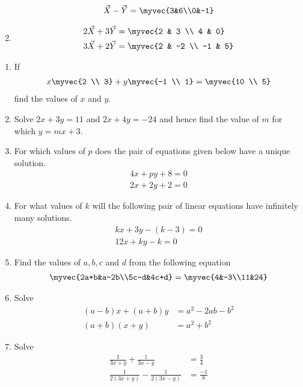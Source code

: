 \begin{multicols}{2}
\begin{enumerate}[label=\thesubsection.\arabic*,ref=\thesubsection.\theenumi]
\begin{align*}
	\\
\vec{X}-\vec{Y}=\myvec{3&6\\0&-1}
\end{align*}
\item 
\begin{align*}
	2\vec{X}+3\vec{Y}&=\myvec
{2 & 3 \\ 4 & 0}  
	\\
	3\vec{X}+2\vec{Y}&=\myvec
{2 & -2 \\ -1 & 5}
\end{align*}
\end{enumerate}
\end{multicols}
\begin{enumerate}[label=\thesubsection.\arabic*,ref=\thesubsection.\theenumi,resume*]
\item If 
\begin{align}
	x \myvec
{2 \\ 3} + y \myvec
{-1 \\ 1}= \myvec
{10 \\ 5}
\end{align}
find the values of $x$ and $y$.
\item Solve $2x+3y=11$ and $2x+4y=-24$ and hence find the value of $m$ for which $y=mx+3$.
\item For which values of $p$ does the pair of equations given below have a unique solution.
\begin{align}
4x+py+8 = 0 \\ 2x+2y+2 = 0
\end{align}
\item For what values of $k$ will the following pair of linear equations have infinitely many solutions.
\begin{align}
kx+3y-(k-3) = 0 \\ 12x+ky-k = 0
\end{align}
\item Find the values of $a, b, c$ and $d$ from the following equation 
\begin{align} 
\myvec{2a+b&a-2b\\5c-d&4c+d} = \myvec{4&-3\\11&24} 
\end{align}
\item
Solve
\begin{align*}
(a-b)x+(a+b)y&=a^2-2ab-b^2\\ (a+b)(x+y)&=a^2+b^2
\end{align*}
\item
Solve
\begin{align*}
\frac{1}{3x+y}+\frac{1}{3x-y}&=\frac{3}{4}\\ \frac{1}{2(3x+y)}-\frac{1}{2(3x-y)}&=\frac{-1}{8}
\end{align*}
\end{enumerate}
